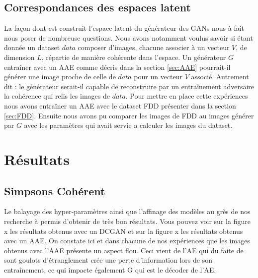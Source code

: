 \documentclass[11pt,francais]{article}
\begin{document}
\subsection{Correspondances des espaces latent}
\label{sec:CorrespondancesLS}
La façon dont est construit l'espace latent du générateur des GANs nous à fait nous poser de nombreuse questions.
Nous avons notamment voulus savoir si étant donnée un dataset \(data\) composer d'images, chacune associer à un vecteur \(V\), de dimension \(L\), répartie de manière cohérente dans l'espace. Un générateur \(G\) entraîner avec un AAE comme décris dans la section \ref{sec:AAE} pourrait-il générer une image proche de celle de \(data\) pour un vecteur \(V\) associé. Autrement dit : le générateur serait-il capable de reconstruire par un entraînement adversaire la cohérence qui relis les images de \(data\). 
Pour mettre en place cette expériences nous avons entraîner un AAE avec le dataset FDD présenter dans la section \ref{sec:FDD}. Ensuite nous avons pu comparer les images de FDD au images générer par \(G\) avec les paramètres qui avait servie a calculer les images du dataset.

\section{Résultats}

\subsection{Simpsons Cohérent}
\label{sec:SimpsonsCoherent}
Le balayage des hyper-paramètres ainsi que l'affinage des modèles au grès de nos recherche à permis d'obtenir de très bon résultats. Vous pouvez voir sur la figure x les résultats obtenus avec un DCGAN et sur la figure x les résultats obtenus avec un AAE.
On constate ici et dans chacune de nos expériences que les images obtenus avec l'AAE présente un aspect flou. Ceci vient de l'AE qui du faite de sont goulots d'étranglement crée une perte d'information lors de son entraînement, ce qui impacte également G qui est le décoder de l'AE.
\end{document}
